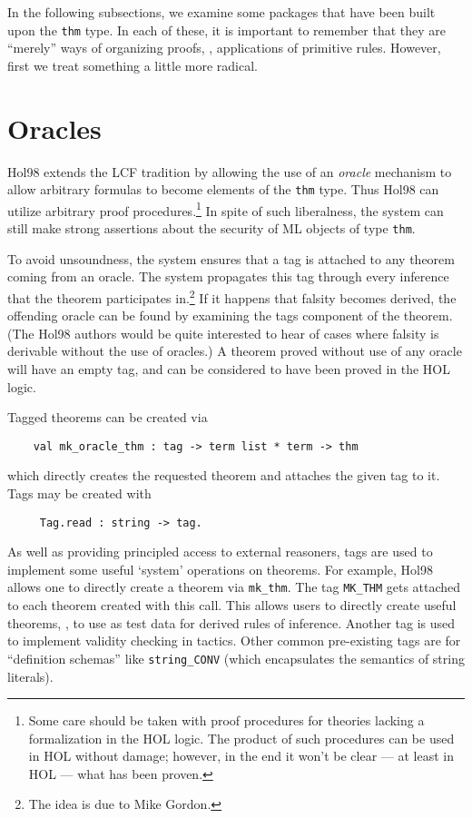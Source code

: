\documentclass[12pt,fleqn,a4paper]{report}
\begin{document}
 In the following subsections, we examine some packages that have been
 built upon the \verb+thm+ type. In each of these, it is important to
 remember that they are ``merely'' ways of organizing proofs, \ie,
 applications of primitive rules. However, first we treat something a
 little more radical.

\section{Oracles}

Hol98 extends the LCF tradition by allowing the use of an {\it
  oracle\/} mechanism to allow arbitrary formulas to become elements
of the \verb+thm+ type. Thus Hol98 can utilize arbitrary proof
procedures.\footnote{Some care should be taken with proof procedures
  for theories lacking a formalization in the HOL logic. The product
  of such procedures can be used in HOL without damage; however, in
  the end it won't be clear --- at least in HOL --- what has been
  proven.} In spite of such liberalness, the system can still make
strong assertions about the security of ML objects of type \verb+thm+.

To avoid unsoundness, the system ensures that a tag is attached to any
theorem coming from an oracle. The system propagates this tag through
every inference that the theorem participates in.\footnote{The idea is
  due to Mike Gordon.} If it happens that falsity becomes derived, the
offending oracle can be found by examining the tags component of the
theorem. (The Hol98 authors would be quite interested to hear of cases
where falsity is derivable without the use of oracles.) A theorem
proved without use of any oracle will have an empty tag, and can be
considered to have been proved in the HOL logic.

Tagged theorems can be created via
\begin{verbatim}
    val mk_oracle_thm : tag -> term list * term -> thm
\end{verbatim}
which directly creates the requested theorem and attaches the given tag to
it. Tags may be created with
\begin{verbatim}
     Tag.read : string -> tag.
\end{verbatim}
As well as providing principled access to external reasoners, tags are
used to implement some useful `system' operations on theorems. For
example, Hol98 allows one to directly create a theorem via
\verb+mk_thm+. The tag \verb+MK_THM+ gets attached to each theorem
created with this call. This allows users to directly create useful
theorems, \eg, to use as test data for derived rules of inference.
Another tag is used to implement validity checking in tactics. Other
common pre-existing tags are for ``definition schemas'' like
\verb+string_CONV+ (which encapsulates the semantics of string
literals).
\end{document}
